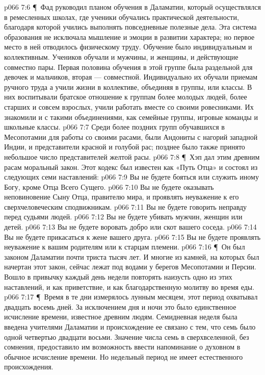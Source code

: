 \vs p066 7:6 \P\ Фад руководил планом обучения в Даламатии, который осуществлялся в ремесленных школах, где ученики обучались практической деятельности, благодаря которой учились выполнять повседневные полезные дела. Эта система образования не исключала мышление и эмоции в развитии характера; но первое место в ней отводилось физическому труду. Обучение было индивидуальным и коллективным. Учеников обучали и мужчины, и женщины, и действующие совместно пары. Первая половина обучения в этой группе была раздельной для девочек и мальчиков, вторая --- совместной. Индивидуально их обучали приемам ручного труда а учили жизни в коллективе, объединяя в группы, или классы. В них воспитывали братское отношение к группам более молодых людей, более старших и совсем взрослых, учили работать вместе со своими ровесниками. Их знакомили и с такими объединениями, как семейные группы, игровые команды и школьные классы.
\vs p066 7:7 Среди более поздних групп обучавшихся в Месопотамии для работы со своими расами, были Андониты с нагорий западной Индии, и представители красной и голубой рас; позднее было также принято небольшое число представителей желтой расы.
\vs p066 7:8 \P\ Хэп дал этим древним расам моральный закон. Этот кодекс был известен как «Путь Отца» и состоял из следующих семи наставлений:
\vs p066 7:9 \bibnobreakspace Вы не будете бояться или служить иному Богу, кроме Отца Всего Сущего.
\vs p066 7:10 \bibnobreakspace Вы не будете оказывать неповиновение Сыну Отца, правителю мира, и проявлять неуважение к его сверхчеловеческим сподвижникам.
\vs p066 7:11 \bibnobreakspace Вы не будете говорить неправду перед судьями людей.
\vs p066 7:12 \bibnobreakspace Вы не будете убивать мужчин, женщин или детей.
\vs p066 7:13 \bibnobreakspace Вы не будете воровать добро или скот вашего соседа.
\vs p066 7:14 \bibnobreakspace Вы не будете прикасаться к жене вашего друга.
\vs p066 7:15 \bibnobreakspace Вы не будете проявлять неуважение к вашим родителям или к старцам племени.
\vs p066 7:16 \P\ Он был законом Даламатии почти триста тысяч лет. И многие из камней, на которых был начертан этот закон, сейчас лежат под водами у берегов Месопотамии и Персии. Вошло в привычку каждый день недели повторять наизусть одно из этих наставлений, и как приветствие, и как благодарственную молитву во время еды.
\vs p066 7:17 \P\ Время в те дни измерялось лунным месяцем, этот период охватывал двадцать восемь дней. За исключением дня и ночи это было единственное исчисление времени, известное древним людям. Семидневная неделя была введена учителями Даламатии и происхождение ее связано с тем, что семь было одной четвертью двадцати восьми. Значение числа семь в сверхвселенной, без сомнения, предоставило им возможность ввести напоминание о духовном в обычное исчисление времени. Но недельный период не имеет естественного происхождения.
